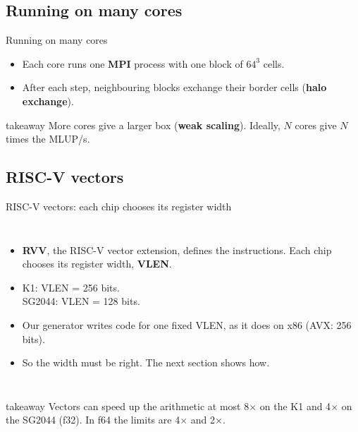 \documentclass[aspectratio=169,10pt,t]{beamer}
\newcommand{\sx}[1]{#1\ensuremath{\times}} %
\newcommand{\term}[1]{\textcolor{psblue!85!black}{\textbf{#1}}} %
\newcommand{\takeaway}[1]{\par\vfill
  \begin{beamercolorbox}[wd=\textwidth,sep=4pt,rounded=true]{takeaway}
    \small #1
  \end{beamercolorbox}}
\begin{document}
\subsection{Running on many cores}
\begin{frame}{Running on many cores}
  \vspace{3mm}
  \centering

  \vspace{4mm}
  \raggedright
  \begin{itemize}\small
    \item Each core runs one \term{MPI} process with one block of $64^3$ cells.
    \item After each step, neighbouring blocks exchange their border cells (\term{halo exchange}).
  \end{itemize}
  \takeaway{More cores give a larger box (\term{weak scaling}). Ideally, $N$ cores give $N$ times the MLUP/s.}
\end{frame}

\subsection{RISC-V vectors}
\begin{frame}{RISC-V vectors: each chip chooses its register width}
  \begin{columns}[T,onlytextwidth]
    \vspace{4mm}
    \centering\resizebox{0.98\linewidth}{!}{}
    \vspace{2mm}
    \begin{itemize}\small
      \item \term{RVV}, the RISC-V vector extension, defines the instructions. Each chip chooses its register
            width, \term{VLEN}.
      \item K1: VLEN = 256 bits.\\ SG2044: VLEN = 128 bits.
      \item Our generator writes code for one fixed VLEN, as it does on x86 (AVX: 256 bits).
      \item So the width must be right. The next section shows how.
    \end{itemize}
  \end{columns}
  \takeaway{Vectors can speed up the arithmetic at most \sx{8} on the K1 and \sx{4} on the SG2044 (f32).
    In f64 the limits are \sx{4} and \sx{2}.}
\end{frame}
\end{document}
